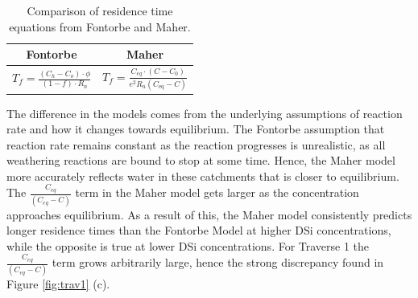 \begin{table}[h]
    \centering
    \renewcommand{\arraystretch}{2.2} %
    \begin{tabular}{cc}
        \toprule
        \textbf{Fontorbe} & \textbf{Maher} \\
        \midrule
        $\displaystyle T_f  = \frac{\left(C_h - C_o\right)\cdot\phi}{\left(1-f\right)\cdot R_n}$ & 
        $\displaystyle T_f = \frac{C_{eq} \cdot \left(C - C_0\right)}{e^2 R_n \left( C_{\text{eq}} - C \right)}$ \\ [10pt]
        \bottomrule
    \end{tabular}
    \caption{Comparison of residence time equations from Fontorbe and Maher.}
    \label{tab:equations}
\end{table}

The difference in the models comes from the underlying assumptions of reaction rate and how it changes towards equilibrium. The Fontorbe assumption that reaction rate remains constant as the reaction progresses is unrealistic, as all weathering reactions are bound to stop at some time. Hence, the Maher model more accurately reflects water in these catchments that is closer to equilibrium. The $\frac{C_{eq}}{(C_{eq} - C)}$ term in the Maher model gets larger as the concentration approaches equilibrium. As a result of this, the Maher model consistently predicts longer residence times than the Fontorbe Model at higher DSi concentrations, while the opposite is true at lower DSi concentrations. For Traverse 1 the $\frac{C_{eq}}{(C_{eq} - C)}$ term grows arbitrarily large, hence the strong discrepancy found in Figure \ref{fig:trav1} (c).

\bsk


